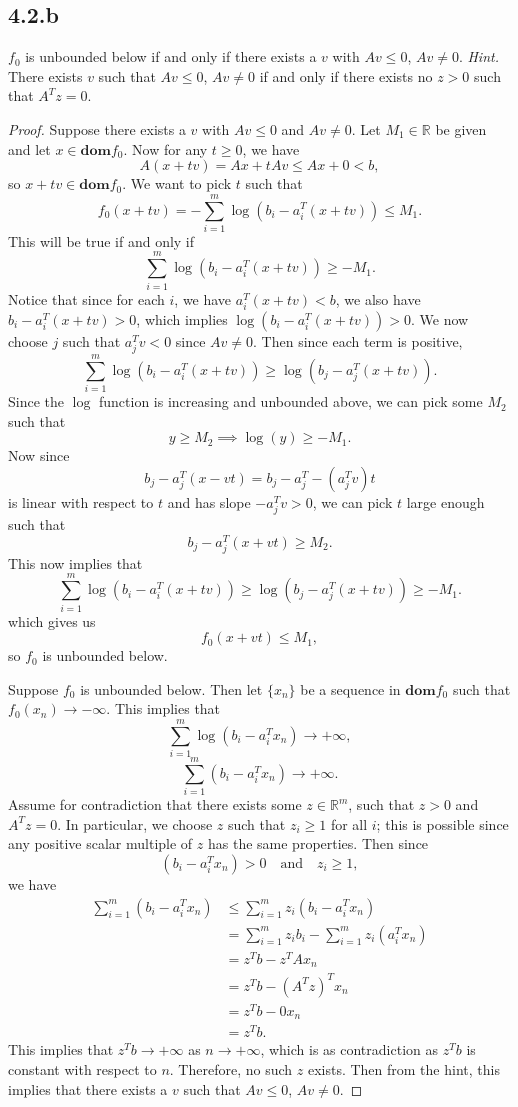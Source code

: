 \documentclass[12pt]{article}
\newcommand{\R}{\mathbb{R}}
\begin{document}
\subsection*{4.2.b}
$f_0$ is unbounded below if and only if there exists a $v$ with $Av\leq0$, $Av\ne0$. \textit{Hint.} There exists $v$ such that $Av\leq0$, $Av\ne0$ if and only if there exists no $z>0$ such that $A^Tz=0$.

\begin{proof}
    Suppose there exists a $v$ with $Av\leq0$ and $Av\ne0$. Let $M_1\in\R$ be given and let $x\in\textbf{dom}f_0$. Now for any $t\geq0$, we have
    \[A(x+tv) = Ax + tAv \leq Ax + 0 < b,\]
    so $x+tv\in\textbf{dom}f_0$. We want to pick $t$ such that
    \[f_0(x+tv) = -\sum_{i=1}^m\log(b_i-a_i^T(x+tv)) \leq M_1.\]
    This will be true if and only if
    \[\sum_{i=1}^m\log(b_i-a_i^T(x+tv)) \geq -M_1.\]
    Notice that since for each $i$, we have $a_i^T(x+tv) < b$, we also have $b_i-a_i^T(x+tv)>0$, which implies $\log(b_i-a_i^T(x+tv))>0$. We now choose $j$ such that $a_j^Tv < 0$ since $Av\ne0$. Then since each term is positive,
    \[\sum_{i=1}^m\log(b_i-a_i^T(x+tv)) \geq \log(b_j-a_j^T(x+tv)).\]
    Since the $\log$ function is increasing and unbounded above, we can pick some $M_2$ such that
    \[y\geq M_2 \implies \log(y)\geq -M_1.\]
    Now since
    \[b_j - a_j^T(x-vt) = b_j-a_j^T - (a_j^Tv)t\]
    is linear with respect to $t$ and has slope $-a_j^Tv>0$, we can pick $t$ large enough such that
    \[b_j-a_j^T(x+vt) \geq M_2.\]
    This now implies that
    \[\sum_{i=1}^m\log(b_i-a_i^T(x+tv)) \geq\log(b_j-a_j^T(x+tv)) \geq -M_1.\]
    which gives us
    \[f_0(x+vt)\leq M_1,\]
    so $f_0$ is unbounded below. 
    
    Suppose $f_0$ is unbounded below. Then let $\{x_n\}$ be a sequence in $\textbf{dom}f_0$ such that $f_0(x_n)\to-\infty$. This implies that
    \[\sum_{i=1}^m\log(b_i-a_i^Tx_n) \to +\infty,\]
    \[\sum_{i=1}^m(b_i-a_i^Tx_n) \to +\infty.\]
    Assume for contradiction that there exists some $z\in\R^m$, such that $z>0$ and $A^Tz = 0$. In particular, we choose $z$ such that $z_i\geq1$ for all $i$; this is possible since any positive scalar multiple of $z$ has the same properties. Then since
    \[(b_i-a_i^Tx_n)>0 \quad\text{and}\quad z_i\geq1,\]
    we have
    \begin{align*}
        \sum_{i=1}^m(b_i-a_i^Tx_n) 
            &\leq \sum_{i=1}^m z_i(b_i-a_i^Tx_n) \\
            &= \sum_{i=1}^m z_ib_i - \sum_{i=1}^m z_i(a_i^Tx_n) \\
            &= z^Tb - z^TAx_n \\
            &= z^Tb - (A^Tz)^Tx_n \\
            &= z^Tb - 0x_n \\
            &= z^Tb.
    \end{align*}
    This implies that $z^Tb\to+\infty$ as $n\to+\infty$, which is as contradiction as $z^Tb$ is constant with respect to $n$. Therefore, no such $z$ exists. Then from the hint, this implies that there exists a $v$ such that $Av\leq0$, $Av\ne0$.
    
\end{proof}
\end{document}
